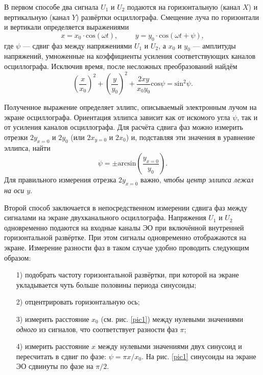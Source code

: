 \documentclass[a4paper, 12pt]{article}
\begin{document}
    В первом способе два сигнала $U_1$ и $U_2$ подаются на горизонтальную (канал $X$) и вертикальную (канал $Y$) развёртки осциллографа. Смещение луча по горизонтали и вертикали определяется выражениями
    \begin{equation}
        x = x_0 \cdot \mathrm{cos}(\omega t), \hspace{1cm} y = y_0 \cdot \mathrm{cos}(\omega t + \psi),
    \end{equation}
    где $\psi$ — сдвиг фаз между напряжениями $U_1$ и $U_2$, а $x_0$ и $y_0$ — амплитуды напряжений, умноженные на коэффициенты усиления соответствующих каналов осциллографа. Исключив время, после несложных преобразований найдём
    \begin{equation}
        \left( \frac{x}{x_0} \right)^2 + \left( \frac{y}{y_0} \right)^2 + \frac{2 x y}{x_0 y_0} \mathrm{cos}\psi = \mathrm{sin}^2\psi.
    \end{equation}
    
    Полученное выражение определяет эллипс, описываемый электронным лучом на экране осциллографа. Ориентация эллипса зависит как от искомого угла $\psi$, так и от усиления каналов осциллографа. Для расчёта сдвига фаз можно измерить отрезки $2y_{x=0}$ и $2y_0$ (или $2x_{y=0}$ и $2x_0$) и, подставляя эти значения в уравнение эллипса, найти
    \begin{equation}
        \psi = \pm \mathrm{arcsin} \left( \frac{y_{x=0}}{y_0} \right).
        \label{eq1}
    \end{equation}
    Для правильного измерения отрезка $2y_{x=0}$ важно, \textit{чтобы центр эллипса лежал на оси $y$}.
    
    Второй способ заключается в непосредственном измерении сдвига фаз между сигналами на экране двухканального осциллографа. Напряжения $U_1$ и $U_2$ одновременно подаются на входные каналы ЭО при включённой внутренней горизонтальной развёртке. При этом сигналы одновременно отображаются на экране. Измерение разности фаз в таком случае удобно проводить следующим образом:
    \begin{enumerate}
        \item[1)] подобрать частоту горизонтальной развёртки, при которой на экране укладывается чуть больше половины периода синусоиды;
        \item[2)] отцентрировать горизонтальную ось;
        \item[3)] измерить расстояние $x_0$ (см. рис. \ref{pic1}) между нулевыми значениями \textit{одного} из сигналов, что соответствует разности фаз $\pi$;
        \item[4)] измерить расстояние $x$ между нулевыми значениями двух синусоид и пересчитать в сдвиг по фазе: $\psi = \pi x / x_0$. На рис. \ref{pic1} синусоиды на экране ЭО сдвинуты по фазе на $\pi / 2$.
    \end{enumerate}
    
\end{document}
